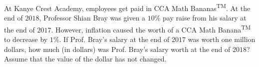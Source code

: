 At Kanye Crest Academy, employees get paid in CCA Math Bananas\textsuperscript{TM}. At the end of $2018$, Professor Shian Bray was given a $10\%$ pay raise from his salary at the end of $2017$. However, inflation caused the worth of a CCA Math Banana\textsuperscript{TM} to decrease by $1\%$. If Prof. Bray's salary at the end of $2017$ was worth one million dollars, how much (in dollars) was Prof. Bray's salary worth at the end of $2018$? Assume that the value of the dollar has not changed.